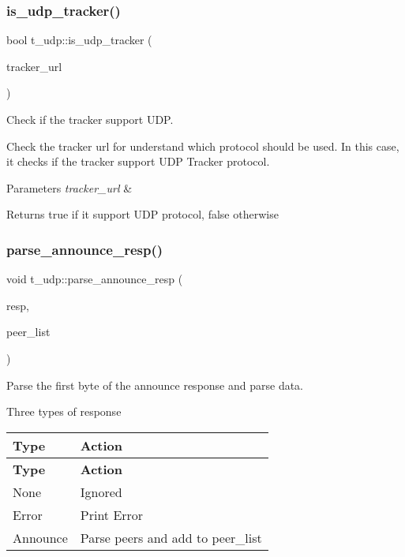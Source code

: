 \subsubsection{\texorpdfstring{is\+\_\+udp\+\_\+tracker()}{is\_udp\_tracker()}}
{\footnotesize\ttfamily bool t\+\_\+udp\+::is\+\_\+udp\+\_\+tracker (\begin{DoxyParamCaption}\item[{const std\+::string \&}]{tracker\+\_\+url }\end{DoxyParamCaption})}



Check if the tracker support U\+DP. 

Check the tracker url for understand which protocol should be used. In this case, it check\textquotesingle{}s if the tracker support U\+DP Tracker protocol.


\begin{DoxyParams}{Parameters}
{\em tracker\+\_\+url} & \\
\hline
\end{DoxyParams}
\begin{DoxyReturn}{Returns}
true if it support U\+DP protocol, false otherwise 
\end{DoxyReturn}
\mbox{\label{namespacet__udp_a1f2a0ab9801cbc55002e67c166895a0e}} 
\subsubsection{\texorpdfstring{parse\+\_\+announce\+\_\+resp()}{parse\_announce\_resp()}}
{\footnotesize\ttfamily void t\+\_\+udp\+::parse\+\_\+announce\+\_\+resp (\begin{DoxyParamCaption}\item[{std\+::vector$<$ uint8\+\_\+t $>$ \&}]{resp,  }\item[{pwp\+::\+Peer\+List}]{peer\+\_\+list }\end{DoxyParamCaption})}



Parse the first byte of the announce response and parse data. 

Three types of response

\tabulinesep=1mm
\begin{longtabu} spread 0pt [c]{*{2}{|X[-1]}|}
\hline
\rowcolor{\tableheadbgcolor}\textbf{ Type }&\textbf{ Action  }\\
\endfirsthead
\hline
\endfoot
\hline
\rowcolor{\tableheadbgcolor}\textbf{ Type }&\textbf{ Action  }\\
\endhead
None &Ignored \\
Error &Print Error \\
Announce &Parse peers and add to peer\+\_\+list \\
\end{longtabu}

